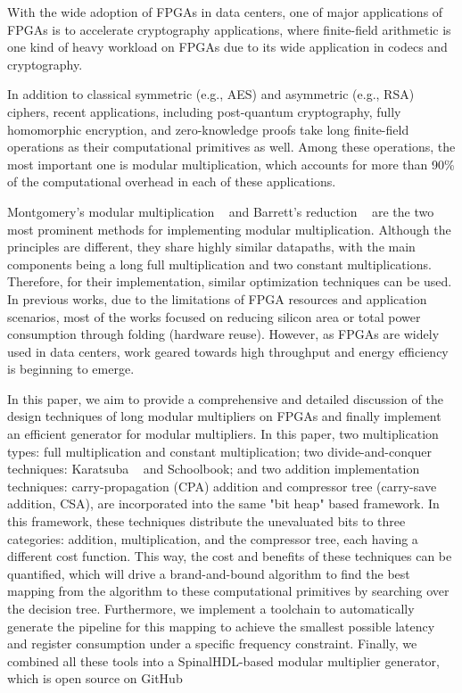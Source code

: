 \documentclass[conference]{IEEEtran}
\begin{document}
With the wide adoption of FPGAs in data centers, one of major applications of FPGAs is to accelerate cryptography applications, where finite-field arithmetic is one kind of heavy workload on FPGAs due to its wide application in codecs and cryptography.


In addition to classical symmetric (e.g., AES) and asymmetric (e.g., RSA) ciphers, recent applications, including post-quantum cryptography, fully homomorphic encryption, and zero-knowledge proofs take long finite-field operations as their computational primitives as well. Among these operations, the most important one is modular multiplication, which accounts for more than 90\% of the computational overhead in each of these applications.

Montgomery's modular multiplication ~\cite{Montgomery}  and Barrett's reduction ~\cite{Implementing_the_Rivest_Shamir_and_Adleman_public_key} are the two most prominent methods for implementing modular multiplication. Although the principles are different, they share highly similar datapaths, with the main components being a long full multiplication and two constant multiplications. Therefore, for their implementation, similar optimization techniques can be used. In previous works, due to the limitations of FPGA resources and application scenarios, most of the works focused on reducing silicon area or total power consumption through folding (hardware reuse). However, as FPGAs are widely used in data centers, work geared towards high throughput and energy efficiency is beginning to emerge.

In this paper, we aim to provide a comprehensive and detailed discussion of the design techniques of long modular multipliers on FPGAs and finally implement an efficient generator for modular multipliers. In this paper, two multiplication types: full multiplication and constant multiplication; two divide-and-conquer techniques: Karatsuba ~\cite{Multiplication_of_multidigit_numbers_on_automata} and Schoolbook; and two addition implementation techniques: carry-propagation (CPA) addition and compressor tree (carry-save addition, CSA), are incorporated into the same "bit heap" based framework. In this framework, these techniques distribute the unevaluated bits to three categories: addition, multiplication, and the compressor tree, each having a different cost function. This way, the cost and benefits of these techniques can be quantified, which will drive a brand-and-bound algorithm to find the best mapping from the algorithm to these computational primitives by searching over the decision tree. Furthermore, we implement a toolchain to automatically generate the pipeline for this mapping to achieve the smallest possible latency and register consumption under a specific frequency constraint. Finally, we combined all these tools into a SpinalHDL-based modular multiplier generator, which is open source on GitHub
\end{document}
